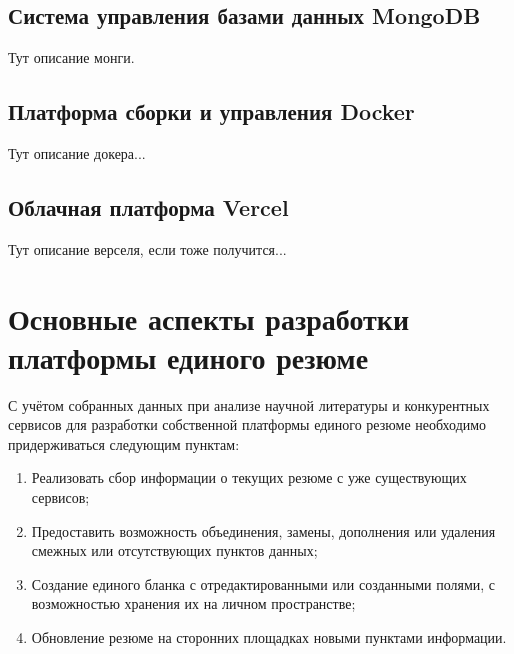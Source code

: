 \documentclass[master, och, diploma]{SCWorks}
\begin{document}
\subsection{Система управления базами данных MongoDB}
Тут описание монги.

\subsection{Платформа сборки и управления Docker}
Тут описание докера...

\subsection{Облачная платформа Vercel}
Тут описание верселя, если тоже получится...






\section{Основные аспекты разработки платформы единого резюме}
С учётом собранных данных при анализе научной литературы и конкурентных сервисов для разработки собственной платформы единого резюме необходимо придерживаться следующим пунктам:
\begin{enumerate}
    \item Реализовать сбор информации о текущих резюме с уже существующих сервисов;
    \item Предоставить возможность объединения, замены, дополнения или удаления 
    смежных или отсутствующих пунктов данных;
    \item Создание единого бланка с отредактированными или созданными полями, 
    с возможностью хранения их на личном пространстве;
    \item Обновление резюме на сторонних площадках новыми пунктами информации.
\end{enumerate}
\end{document}
